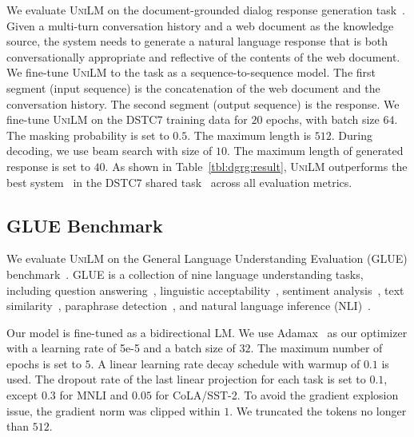 \documentclass{article}
\newcommand\ours{\textsc{UniLM}}
\begin{document}
We evaluate \ours{} on the document-grounded dialog response generation task~\cite{conversing:dataset,gao2019neural}.
Given a multi-turn conversation history and a web document as the knowledge source, the system needs to generate a natural language response that is both conversationally appropriate and reflective of the contents of the web document.
We fine-tune \ours{} to the task as a sequence-to-sequence model. The first segment (input sequence) is the concatenation of the web document and the conversation history. The second segment (output sequence) is the response.
We fine-tune \ours{} on the DSTC7 training data for $20$ epochs, with batch size $64$.
The masking probability is set to $0.5$. The maximum length is $512$.
During decoding, we use beam search with size of $10$. The maximum length of generated response is set to $40$.
As shown in Table~\ref{tbl:dgrg:result}, \ours{} outperforms the best system~\cite{tam2019cluster} in the DSTC7 shared task~\cite{dstc7} across all evaluation metrics.


\subsection{GLUE Benchmark}

We evaluate \ours{} on the General Language Understanding Evaluation (GLUE) benchmark~\cite{wang2018glue}. GLUE is a collection of nine language understanding tasks,
including question answering~\cite{squad1}, linguistic acceptability~\cite{cola2018}, sentiment analysis~\cite{sst2013}, text similarity~\cite{sts-b2017}, paraphrase detection~\cite{mrpc2005}, and natural language inference (NLI)~\cite{rte1,rte2,rte3,rte5,winograd2012,mnli2017}.


Our model is fine-tuned as a bidirectional LM.
We use Adamax~\cite{kingma2014adam} as our optimizer with a learning rate of 5e-5 and a batch size of $32$. The maximum number of epochs is set to $5$. A linear learning rate decay schedule with warmup of $0.1$ is used. The dropout rate of the last linear projection for each task is set to $0.1$, except $0.3$ for MNLI and $0.05$ for CoLA/SST-2. 
To avoid the gradient explosion issue, the gradient norm was clipped within $1$. We truncated the tokens no longer than $512$.
\end{document}
